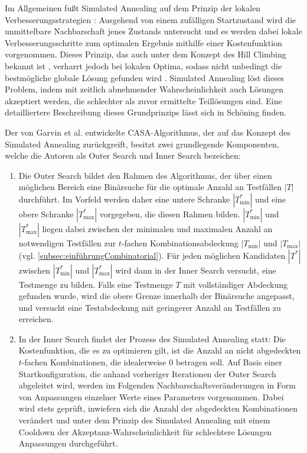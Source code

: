Im Allgemeinen fußt Simulated Annealing auf dem Prinzip der lokalen Verbesserungsstrategien \cite[S. 330]{schoening2001algorithmik}: Ausgehend von einem zufälligen Startzustand wird die unmittelbare Nachbarschaft jenes Zustands untersucht und es werden dabei lokale Verbesserungsschritte zum optimalen Ergebnis mithilfe einer Kostenfunktion vorgenommen. Dieses Prinzip, das auch unter dem Konzept des Hill Climbing bekannt ist \cite[S.327]{schoening2001algorithmik}, verharrt jedoch bei lokalen Optima, sodass nicht unbedingt die bestmögliche globale Lösung gefunden wird \cite[S.327]{schoening2001algorithmik}. Simulated Annealing löst dieses Problem, indem mit zeitlich abnehmender Wahrscheinlichkeit auch Lösungen akzeptiert werden, die schlechter als zuvor ermittelte Teillösungen sind. Eine detailliertere Beschreibung dieses Grundprinzips lässt sich in Schöning \cite[S.329 ff.]{schoening2001algorithmik} finden.

Der von Garvin et al. \cite{garvin2011evaluating} entwickelte CASA-Algorithmus, der auf das Konzept des Simulated Annealing zurückgreift, besitzt zwei grundlegende Komponenten, welche die Autoren als \glqq Outer Search\grqq{} und \glqq Inner Search\grqq{} bezeichen:
\begin{enumerate}
\item Die \glqq Outer Search\grqq{} bildet den Rahmen des Algorithmus, der über einen möglichen Bereich eine Binärsuche für die optimale Anzahl an Testfällen $|T|$ durchführt. Im Vorfeld werden daher eine untere Schranke $|T^*_{\min}|$ und eine obere Schranke $|T^*_{\max}|$ vorgegeben, die diesen Rahmen bilden. $|T^*_{\min}|$ und $|T^*_{\max}|$ liegen dabei zwischen der minimalen und maximalen Anzahl an notwendigen Testfällen zur $t$-fachen Kombinationsabdeckung $|T_{\min}|$ und $|T_{\max}|$ (vgl. \autoref{subsec:einführungCombinatorial}). Für jeden möglichen Kandidaten $|T^*|$ zwischen  $|T^*_{\min}|$ und $|T^*_{\max}|$ wird dann in der \glqq Inner Search\grqq{} versucht, eine Testmenge zu bilden. Falls eine Testmenge $T$ mit vollständiger Abdeckung gefunden wurde, wird die obere Grenze innerhalb der Binärsuche angepasst, und versucht eine Testabdeckung mit geringerer Anzahl an Testfällen zu erreichen.
\item In der \glqq Inner Search\grqq{} findet der Prozess des Simulated Annealing statt: Die Kostenfunktion, die es zu optimieren gilt, ist die Anzahl an nicht abgedeckten $t$-fachen Kombinationen, die idealerweise 0 betragen soll. Auf Basis einer Startkonfiguration, die anhand vorheriger Iterationen der \glqq Outer Search\grqq{} abgeleitet wird, werden im Folgenden Nachbarschaftsveränderungen in Form von Anpassungen einzelner Werte eines Parameters vorgenommen. Dabei wird stets geprüft, inwiefern sich die Anzahl der abgedeckten Kombinationen verändert und unter dem Prinzip des Simulated Annealing mit einem \glqq Cooldown\grqq{} der Akzeptanz-Wahrscheinlichkeit für schlechtere Lösungen Anpassungen durchgeführt.
\end{enumerate}

